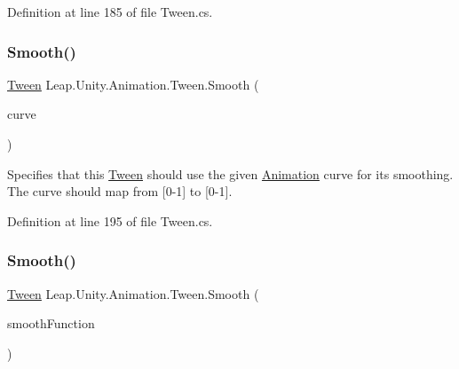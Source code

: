 Definition at line 185 of file Tween.\+cs.

\mbox{\label{struct_leap_1_1_unity_1_1_animation_1_1_tween_ae1929c2f7f8dc7636e16d54b67d75337}} 
\subsubsection{\texorpdfstring{Smooth()}{Smooth()}\hspace{0.1cm}{\footnotesize\ttfamily [2/3]}}
{\footnotesize\ttfamily \mbox{\hyperlink{struct_leap_1_1_unity_1_1_animation_1_1_tween}{Tween}} Leap.\+Unity.\+Animation.\+Tween.\+Smooth (\begin{DoxyParamCaption}\item[{Animation\+Curve}]{curve }\end{DoxyParamCaption})}



Specifies that this \mbox{\hyperlink{struct_leap_1_1_unity_1_1_animation_1_1_tween}{Tween}} should use the given \mbox{\hyperlink{namespace_leap_1_1_unity_1_1_animation}{Animation}} curve for its smoothing. The curve should map from \mbox{[}0-\/1\mbox{]} to \mbox{[}0-\/1\mbox{]}. 



Definition at line 195 of file Tween.\+cs.

\mbox{\label{struct_leap_1_1_unity_1_1_animation_1_1_tween_a27b1991777c67934e885c0d01c64d031}} 
\subsubsection{\texorpdfstring{Smooth()}{Smooth()}\hspace{0.1cm}{\footnotesize\ttfamily [3/3]}}
{\footnotesize\ttfamily \mbox{\hyperlink{struct_leap_1_1_unity_1_1_animation_1_1_tween}{Tween}} Leap.\+Unity.\+Animation.\+Tween.\+Smooth (\begin{DoxyParamCaption}\item[{Func$<$ float, float $>$}]{smooth\+Function }\end{DoxyParamCaption})}



